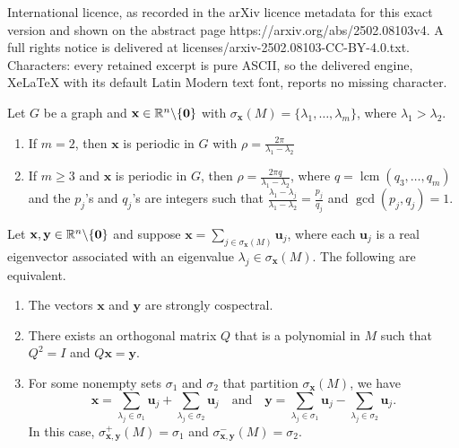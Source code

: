 \documentclass[10pt,a4paper]{amsart}
\def\R{\mathbb{R}}
\newcommand{\bu}{\mathbf u}
\newcommand{\bx}{\mathbf x}
\newcommand{\by}{\mathbf y}
\newcommand{\zero}{{\bf{0}}}
\begin{document}
International licence, as recorded in the arXiv licence metadata for this exact version and shown on the abstract page https://arxiv.org/abs/2502.08103v4. A full rights notice is delivered at licenses/arxiv-2502.08103-CC-BY-4.0.txt. Characters: every retained excerpt is pure ASCII, so the delivered engine, XeLaTeX with its default Latin Modern text font, reports no missing character.
\begin{lemma}\label{Lem:minperiod}
Let $G$ be a graph and $\bx\in\R^n\backslash\{\zero\}$ with $\sigma_{\bx}(M)=\{\lambda_1,\ldots,\lambda_m\}$, where $\lambda_1>\lambda_2$.
\begin{enumerate}
\item If $m=2$, then $\bx$ is periodic in $G$ with $\rho=\frac{2\pi}{\lambda_1-\lambda_2}$
\item If $m\geq 3$ and $\bx$ is periodic in $G$, then $\rho=\frac{2\pi q}{\lambda_1-\lambda_2}$, where $q=\operatorname{lcm}(q_3,\ldots,q_{m})$ and the $p_j$'s and $q_j$'s are integers such that $\frac{\lambda_1-\lambda_j}{\lambda_1-\lambda_2}=\frac{p_j}{q_j}$ and $\operatorname{gcd}(p_j,q_j)=1$.
\end{enumerate}
\end{lemma}

\begin{theorem}
\label{Prop:sc}
Let $\bx,\by\in \R^n\backslash\{\zero\}$ and suppose
$\bx=\sum_{j\in \sigma_{\bx}(M)}\bu_j$, where each $\bu_j$ is a real eigenvector associated with an eigenvalue $\lambda_j\in \sigma_{\bx}(M)$. The following are equivalent.
\begin{enumerate}
\item The vectors $\bx$ and $\by$ are strongly cospectral.
\item There exists an orthogonal matrix $Q$ that is a polynomial in $M$ such that $Q^2=I$ and $Q\bx=\by$.
\item For some nonempty sets $\sigma_1$ and $\sigma_2$ that partition $\sigma_{\bx}(M)$, we have
\begin{equation*}
\bx=\sum_{\lambda_j\in \sigma_1}\bu_j+\sum_{\lambda_j\in \sigma_2}\bu_j\quad \text{and}\quad \by=\sum_{\lambda_j\in \sigma_1}\bu_j-\sum_{\lambda_j\in \sigma_2}\bu_j.
\end{equation*}
In this case, $\sigma_{\bx,\by}^{+}(M)=\sigma_1$ and $\sigma_{\bx,\by}^{-}(M)=\sigma_2$.
\end{enumerate}
\end{theorem}
\end{document}

